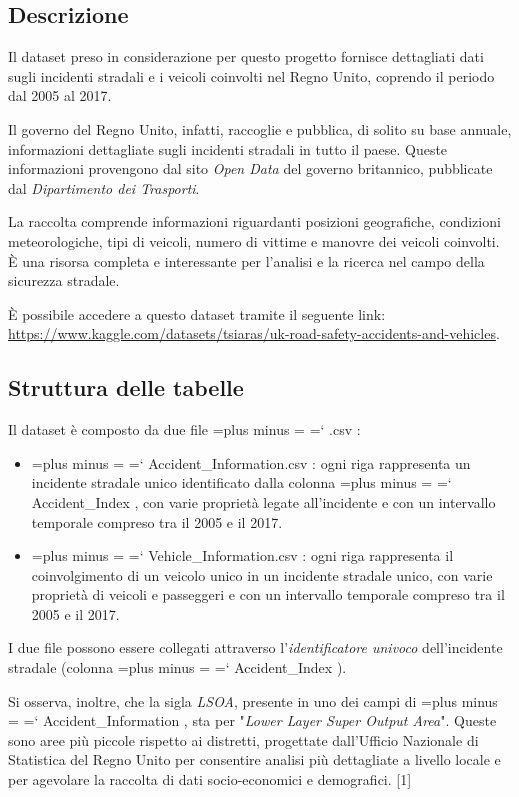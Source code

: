 \documentclass{article}
\renewcommand {\texttt}[1]{%
  \begingroup
    \spaceskip=\fontdimen2\font plus \fontdimen3\font minus \fontdimen4\font
    \xspaceskip=\fontdimen7\font\relax
    \ttfamily
    \hyphenchar\font=`\-
    #1
  \endgroup
}
\begin{document}
\subsection{Descrizione}

Il dataset preso in considerazione per questo progetto fornisce dettagliati dati sugli incidenti stradali e i veicoli coinvolti nel Regno Unito, coprendo il periodo dal 2005 al 2017.

Il governo del Regno Unito, infatti, raccoglie e pubblica, di solito su base annuale, informazioni dettagliate sugli incidenti stradali in tutto il paese. Queste informazioni provengono dal sito \textit{Open Data} del governo britannico, pubblicate dal \textit{Dipartimento dei Trasporti}.

La raccolta comprende informazioni riguardanti posizioni geografiche, condizioni meteorologiche, tipi di veicoli, numero di vittime e manovre dei veicoli coinvolti. È una risorsa completa e interessante per l'analisi e la ricerca nel campo della sicurezza stradale.

È possibile accedere a questo dataset tramite il seguente link: \url{https://www.kaggle.com/datasets/tsiaras/uk-road-safety-accidents-and-vehicles}.

\subsection{Struttura delle tabelle}

Il dataset è composto da due file \texttt{.csv}:

\begin{itemize}
    \item \texttt{Accident\_Information.csv}: ogni riga rappresenta un incidente stradale unico identificato dalla colonna \texttt{Accident\_Index}, con varie proprietà legate all'incidente e con un intervallo temporale compreso tra il 2005 e il 2017.
    \item \texttt{Vehicle\_Information.csv}: ogni riga rappresenta il coinvolgimento di un veicolo unico in un incidente stradale unico, con varie proprietà di veicoli e passeggeri e con un intervallo temporale compreso tra il 2005 e il 2017.
\end{itemize}

I due file possono essere collegati attraverso l'\textit{identificatore univoco} dell'incidente stradale (colonna \texttt{Accident\_Index}).

Si osserva, inoltre, che la sigla \textit{LSOA}, presente in uno dei campi di \texttt{Accident\_Information}, sta per "\textit{Lower Layer Super Output Area}". Queste sono aree più piccole rispetto ai distretti, progettate dall'Ufficio Nazionale di Statistica del Regno Unito per consentire analisi più dettagliate a livello locale e per agevolare la raccolta di dati socio-economici e demografici. [1]
\end{document}

